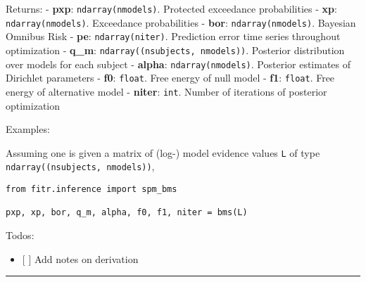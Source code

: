 Returns: - \textbf{pxp}: \texttt{ndarray(nmodels)}. Protected exceedance
probabilities - \textbf{xp}: \texttt{ndarray(nmodels)}. Exceedance
probabilities - \textbf{bor}: \texttt{ndarray(nmodels)}. Bayesian
Omnibus Risk - \textbf{pe}: \texttt{ndarray(niter)}. Prediction error
time series throughout optimization - \textbf{q\_m}:
\texttt{ndarray((nsubjects,\ nmodels))}. Posterior distribution over
models for each subject - \textbf{alpha}: \texttt{ndarray(nmodels)}.
Posterior estimates of Dirichlet parameters - \textbf{f0}:
\texttt{float}. Free energy of null model - \textbf{f1}: \texttt{float}.
Free energy of alternative model - \textbf{niter}: \texttt{int}. Number
of iterations of posterior optimization

Examples:

Assuming one is given a matrix of (log-) model evidence values
\texttt{L} of type \texttt{ndarray((nsubjects,\ nmodels))},

\begin{verbatim}
from fitr.inference import spm_bms

pxp, xp, bor, q_m, alpha, f0, f1, niter = bms(L)
\end{verbatim}

Todos:

\begin{itemize}
\tightlist
\item
  {[} {]} Add notes on derivation
\end{itemize}

\begin{center}\rule{0.5\linewidth}{\linethickness}\end{center}
